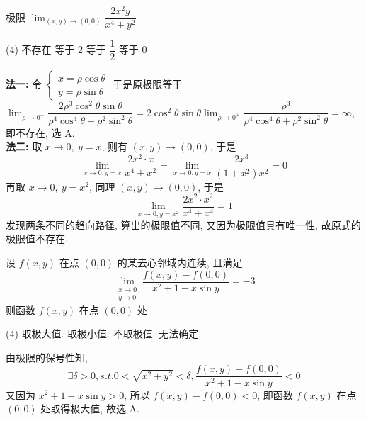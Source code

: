 \begin{example}
    极限 $\displaystyle\lim_{(x,y)\to(0,0)}\dfrac{2x^2y}{x^4+y^2}$
    \begin{tasks}(4)
        \task 不存在
        \task 等于 2
        \task 等于 $\dfrac{1}{2}$
        \task 等于 0
    \end{tasks}
\end{example}
\begin{solution}
    \textbf{法一: }令 $\begin{cases}
            x=\rho\cos\theta \\y=\rho\sin\theta
        \end{cases}$
    于是原极限等于 $\displaystyle\lim_{\rho\to0^+}\dfrac{2\rho^3\cos^2\theta\sin\theta }{\rho^4\cos^4\theta+\rho^2\sin^2\theta}=2\cos^2\theta\sin\theta\lim_{\rho\to0^+}\dfrac{\rho^3}{\rho^4\cos^4\theta+\rho^2\sin^2\theta}=\infty$, 即不存在, 选 A.\\
    \textbf{法二: }取 $x\to0,~y=x$, 则有 $(x,y)\to(0,0)$, 于是 $$\displaystyle\lim_{x\to0,y=x}\dfrac{2x^2\cdot x}{x^4+x^2}=\lim_{x\to0,y=x}\dfrac{2x^3}{(1+x^2)x^2}=0$$
    再取 $x\to0,~y=x^2$, 同理 $(x,y)\to(0,0)$, 于是 $$\displaystyle\lim_{x\to0,y=x^2}\dfrac{2x^2\cdot x^2}{x^4+x^4}=1$$
    发现两条不同的趋向路径, 算出的极限值不同, 又因为极限值具有唯一性, 故原式的极限值不存在.
\end{solution}

\begin{example}
    设 $f(x,y)$ 在点 $(0,0)$ 的某去心邻域内连续, 且满足 $$
    \lim_{\substack{x\to0 \\ y\to0}}\dfrac{f(x,y)-f(0,0)}{x^2+1-x\sin y}=-3
    $$
    则函数 $f(x,y)$ 在点 $(0,0)$ 处 
    \begin{tasks}(4)
        \task 取极大值.
        \task 取极小值.
        \task 不取极值.
        \task 无法确定.
    \end{tasks}
\end{example}
\begin{solution}
    由极限的保号性知, $$\exists\delta>0,s.t.0<\sqrt{x^2+y^2}<\delta,\dfrac{f(x,y)-f(0,0)}{x^2+1-x\sin y}<0$$
    又因为 $x^2+1-x\sin y>0$, 所以 $f(x,y)-f(0,0)<0$, 即函数 $f(x,y)$ 在点 $(0,0)$  处取得极大值, 故选 A.
\end{solution}

%     

